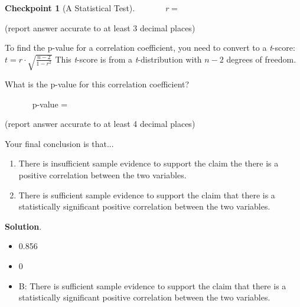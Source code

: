 \documentclass{amsart}
\theoremstyle{plain}%
\theoremstyle{definition}%
\newtheorem{inlineexercise}[theorem]{Checkpoint}
\theoremstyle{remark}%
\newcommand{\blocktitlefont}{\relax}
\numberwithin{equation}{section}
\begin{document}
\begin{inlineexercise}[A Statistical Test]
       \emph{r} = %
\par
(report answer accurate to at least 3 decimal places)%
\par
To find the p-value for a correlation coefficient, you need to convert to a \emph{t}-score: \(\displaystyle{t}={r}\cdot\sqrt{{\frac{{{n}-{2}}}{{{1}-{r}^{{2}}}}}}\) This \emph{t}-score is from a \emph{t}-distribution with \(\displaystyle{n}-{2}\) degrees of freedom.%
\par
What is the p-value for this correlation coefficient?%
\par
       p-value = %
\par
(report answer accurate to at least 4 decimal places)%
\par
Your final conclusion is that...%
\par
%
\begin{enumerate}
\item{}There is insufficient sample evidence to support the claim the there is a positive correlation between the two variables.%
\item{}There is sufficient sample evidence to support the claim that there is a statistically significant positive correlation between the two variables.%
\end{enumerate}
%
\par\smallskip%
\noindent\textbf{\blocktitlefont Solution}.\hypertarget{section-myopenmath-4-3}{}\quad{}%
\begin{itemize}[label=\textbullet]
\item{}0.856%
\item{}0%
\item{}B: There is sufficient sample evidence to support the claim that there is a statistically significant positive correlation between the two variables.%
\end{itemize}
%
\end{inlineexercise}%
%
\end{document}
